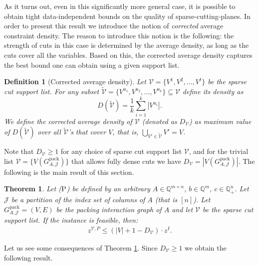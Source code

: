 \documentclass[smallextended]{svjour3}
\newtheorem{definition}[proposition]{Definition}
\newtheorem{theorem}[proposition]{Theorem}
\begin{document}
As it turns out, even in this significantly more general case, it is possible to obtain tight data-independent bounds on the quality of sparse-cutting-planes. In order to present this result we introduce the notion of \emph{corrected} average constraint density. The reason to introduce this notion is the following: the strength of cuts in this case is determined by the average density, as long as the cuts cover all the variables. Based on this, the corrected average density captures the best bound one can obtain using a given support list. 

\begin{definition}[Corrected average density]\label{defn:corraverden}
Let $\mathcal{V} = \{V^1, V^2, \dots, V^t\}$ be the sparse cut support list. For any subset $\tilde{\mathcal{V}} =\{V^{u_1}, V^{u_2}, ..., V^{u_k}\} \subseteq \mathcal{V}$ define its \emph{density} as 
$$D(\tilde{\mathcal{V}}) = \frac{1}{k}\sum_{i = 1}^k|V^{u_i}|.$$
We define the corrected average density  of $\mathcal{V}$ (denoted as $D_{\mathcal{V}}$) as maximum value of $D(\tilde{\mathcal{V}})$ over all $\tilde{\mathcal{V}}$'s that cover $V$, that is, $\bigcup_{V' \in \tilde{\mathcal{V}}} V' = V$.
\end{definition}

Note that $D_{\mathcal{V}} \geq 1$ for any choice of sparse cut support list $\mathcal{V}$, and for the trivial list ${\mathcal{V}} = \{V({G^{\textrm{pack}}_{A, {\mathcal{J}}}})\}$ that allows fully dense cuts we have $D_{\mathcal{V}} = |V({G^{\textrm{pack}}_{A, {\mathcal{J}}}})|$. The following is the main result of this section.

\begin{theorem}\label{thm:supersparseNS}
Let ($\textup{P}$) be defined by an arbitrary $A \in \mathbb{Q}^{m \times n}$, $b \in \mathbb{Q}^m$, $c\in \mathbb{Q}^n_{+}$. Let $\mathcal{J}$ be a partition of the index set of columns of $A$ (that is $[n]$). Let ${G^{\textrm{pack}}_{A, {\mathcal{J}}}} = (V,E)$ be the packing interaction graph of $A$ and let $\mathcal{V}$ be the sparse cut support list. If the instance is feasible, then:
\begin{eqnarray*}
z^{\mathcal{V}, P} \leq \left(|V| + 1 - D_{\mathcal{V}} \right) \cdot z^I.
\end{eqnarray*}
\end{theorem}

Let us see some consequences of Theorem \ref{thm:supersparseNS}. Since $D_{\mathcal{V}} \ge 1$ we obtain the following result. 
\end{document}
